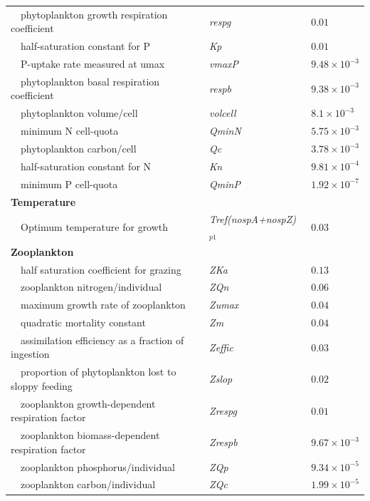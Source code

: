 \documentclass[review]{elsarticle}\usepackage[]{graphicx}\usepackage[]{color}
\begin{document}
\begin{table}[!tbp]
{\begin{center}
\begin{tabular}{lll}
~~phytoplankton growth respiration coefficient&\textit{respg}&$0.01$\tabularnewline
~~half-saturation constant for P&\textit{Kp}&$0.01$\tabularnewline
~~P-uptake rate measured at umax&\textit{vmaxP}&$9.48\times 10^{-3}$\tabularnewline
~~phytoplankton basal respiration coefficient&\textit{respb}&$9.38\times 10^{-3}$\tabularnewline
~~phytoplankton volume/cell&\textit{volcell}&$8.1\times 10^{-3}$\tabularnewline
~~minimum N cell-quota&\textit{QminN}&$5.75\times 10^{-3}$\tabularnewline
~~phytoplankton carbon/cell&\textit{Qc}&$3.78\times 10^{-3}$\tabularnewline
~~half-saturation constant for N&\textit{Kn}&$9.81\times 10^{-4}$\tabularnewline
~~minimum P cell-quota&\textit{QminP}&$1.92\times 10^{-7}$\tabularnewline
\hline
{\bfseries Temperature}&&\tabularnewline
~~Optimum temperature for growth&\textit{Tref(nospA+nospZ)$_{p1}$}&$0.03$\tabularnewline
\hline
{\bfseries Zooplankton}&&\tabularnewline
~~half saturation coefficient for grazing&\textit{ZKa}&$0.13$\tabularnewline
~~zooplankton nitrogen/individual&\textit{ZQn}&$0.06$\tabularnewline
~~maximum growth rate of zooplankton&\textit{Zumax}&$0.04$\tabularnewline
~~quadratic mortality constant&\textit{Zm}&$0.04$\tabularnewline
~~assimilation efficiency as a fraction of ingestion&\textit{Zeffic}&$0.03$\tabularnewline
~~proportion of phytoplankton lost to sloppy feeding&\textit{Zslop}&$0.02$\tabularnewline
~~zooplankton growth-dependent respiration factor&\textit{Zrespg}&$0.01$\tabularnewline
~~zooplankton biomass-dependent respiration factor&\textit{Zrespb}&$9.67\times 10^{-3}$\tabularnewline
~~zooplankton phosphorus/individual&\textit{ZQp}&$9.34\times 10^{-5}$\tabularnewline
~~zooplankton carbon/individual&\textit{ZQc}&$1.99\times 10^{-5}$\tabularnewline
\hline
\end{tabular}\end{center}}
\end{table}
\end{document}
